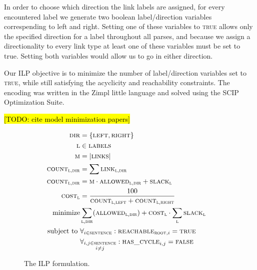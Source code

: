 \documentclass[11pt]{article}
\newcommand{\Note}[1]{}
\renewcommand{\Note}[1]{\hl{[#1]}}  %
\newcommand{\TODO}[1]{\Note{TODO: #1}}
\begin{document}
In order to choose which direction the link labels are assigned, for every encountered label we generate two boolean label/direction variables correspending to left and right. Setting one of these variables to \textsc{true} allows only the specified direction for a label throughout all parses, and because we assign a directionality to every link type at least one of these variables must be set to true. Setting both variables would allow us to go in either direction.

Our ILP objective is to minimize the number of label/direction variables set to \textsc{true}, while still satisfying the acyclicity and reachability constraints. The encoding was written in the Zimpl little language \cite{Koch2004} and solved using the SCIP Optimization Suite\cite{achterberg2009scip}.

\TODO{cite model minimization papers}

\begin{figure}
  \small
  \begin{align}
    \textsc{dir} &= \{\textsc{left}, \textsc{right}\} &\\ 
    \textsc{l} &\in \textsc{labels} & \\
    \textsc{m} &= \left|{\textsc{links}}\right| &\\
    \textsc{count}_{\textsc{l}, \textsc{dir}} &= \sum \textsc{link}_{\textsc{l},\textsc{dir}} &\\
    \textsc{count}_{\textsc{l}, \textsc{dir}} &= \textsc{m} \cdot \textsc{allowed}_{\textsc{l},\textsc{dir}} + \textsc{slack}_{\textsc{l}} &\\
    \textsc{cost}_{\textsc{l}} &= \frac{100}{\textsc{count}_{\textsc{l},\textsc{left}} + \textsc{count}_{\textsc{l},\textsc{right}}} &\\
    \text{minimize} &\sum_{\textsc{l}, \textsc{dir}} (\textsc{allowed}_{\textsc{l},\textsc{dir}}) + \textsc{cost}_{\textsc{l}} \cdot \sum_\textsc{l} \textsc{slack}_{\textsc{l}} &\\
    \text{subject to } &\forall_{i \in \textsc{sentence}}: \textsc{reachable}_{\textsc{root}, i} = \textsc{true} &\\
                       &\forall_{\substack{i,j \in \textsc{sentence} \\ i\neq j }}: \textsc{has\_cycle}_{i,j} = \textsc{false} &
  \end{align}
  \caption{\small The ILP formulation.}
\end{figure}
\end{document}

